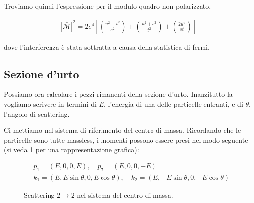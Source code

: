 \documentclass[11pt]{report}
\begin{document}
Troviamo quindi l'espressione per il modulo quadro non polarizzato, 

\begin{align}
    |\mathcal{\bar{M}}|^2 = 2e^4 \left[\left(\frac{u^2 + t^2}{s^2} \right) + \left(\frac{u^2 + s^2}{t^2} \right) + \left(\frac{2u^2}{st} \right)\right]
\end{align}

dove l'interferenza è stata sottratta a causa della statistica di fermi. 

\subsection{Sezione d'urto}

Possiamo ora calcolare i pezzi rimanenti della sezione d'urto. Inanzitutto la vogliamo scrivere in termini di \(E\), l'energia di una delle particelle entranti, e di \(\theta\), l'angolo di scattering. 

Ci mettiamo nel sistema di riferimento del centro di massa. Ricordando che le particelle sono tutte massless, i momenti possono essere presi nel modo seguente (si veda \ref{fig:22scattering} per una rappresentazione grafica): 

\begin{align}
    &p_1 = (E, 0, 0, E), \quad p_2 = (E, 0, 0, -E) \\
    &k_1 = (E, E\sin\theta, 0, E\cos\theta), \quad k_2 = (E, -E\sin\theta, 0, -E\cos\theta)
\end{align}

\begin{figure}[ht]
    \centering
    \caption{Scattering $2\to2$ nel sistema del centro di massa.}
    \label{fig:22scattering}
\end{figure}
\end{document}
